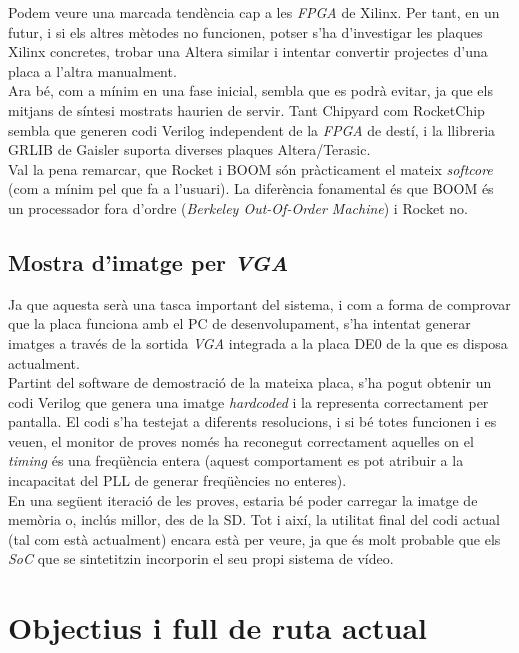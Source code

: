 \documentclass{article}
\begin{document}
Podem veure una marcada tendència cap a les \textit{FPGA} de Xilinx. Per tant, en un futur, i si els altres mètodes no funcionen, potser s'ha d'investigar les plaques Xilinx concretes, trobar una Altera similar i intentar convertir projectes d'una placa a l'altra manualment.\\

Ara bé, com a mínim en una fase inicial, sembla que es podrà evitar, ja que els mitjans de síntesi mostrats haurien de servir.
Tant Chipyard com RocketChip sembla que generen codi Verilog independent de la \textit{FPGA} de destí, i la llibreria GRLIB de Gaisler suporta diverses plaques Altera/Terasic.\\

Val la pena remarcar, que Rocket i BOOM són pràcticament el mateix \textit{softcore} (com a mínim pel que fa a l'usuari). La diferència fonamental és que BOOM és un processador fora d'ordre (\textit{Berkeley Out-Of-Order Machine}) i Rocket no.

\subsection{Mostra d'imatge per \textit{VGA}}

Ja que aquesta serà una tasca important del sistema, i com a forma de comprovar que la placa funciona amb el PC de desenvolupament, s'ha intentat generar imatges a través de la sortida \textit{VGA} integrada a la placa DE0 de la que es disposa actualment.\\

Partint del software de demostració de la mateixa placa, s'ha pogut obtenir un codi Verilog que genera una imatge \textit{hardcoded} i la representa correctament per pantalla.
El codi s'ha testejat a diferents resolucions, i si bé totes funcionen i es veuen, el monitor de proves només ha reconegut correctament aquelles on el \textit{timing} és una freqüència entera (aquest comportament es pot atribuir a la incapacitat del PLL de generar freqüències no enteres).\\

En una següent iteració de les proves, estaria bé poder carregar la imatge de memòria o, inclús millor, des de la SD. Tot i així, la utilitat final del codi actual (tal com està actualment) encara està per veure, ja que és molt probable que els \textit{SoC} que se sintetitzin incorporin el seu propi sistema de vídeo.

\section{Objectius i full de ruta actual}
\end{document}
